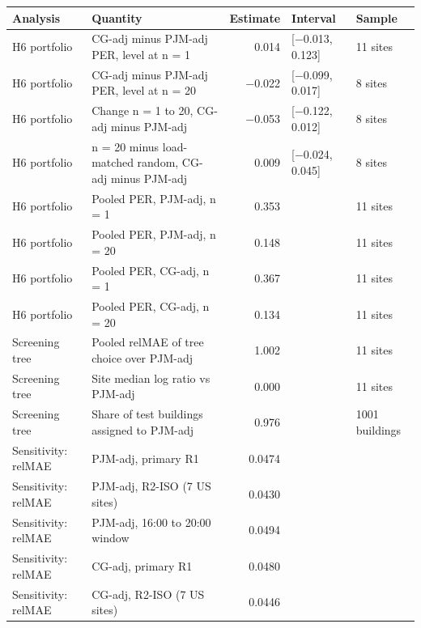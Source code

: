 \begin{tabular}{@{}l>{\raggedright\arraybackslash}p{6.4cm}rll@{}}
\toprule
Analysis & Quantity & Estimate & Interval & Sample \\
\midrule
H6 portfolio & CG-adj minus PJM-adj PER, level at n = 1 & 0.014 & [$-$0.013, 0.123] & 11 sites \\ %
H6 portfolio & CG-adj minus PJM-adj PER, level at n = 20 & $-$0.022 & [$-$0.099, 0.017] & 8 sites \\ %
H6 portfolio & Change n = 1 to 20, CG-adj minus PJM-adj & $-$0.053 & [$-$0.122, 0.012] & 8 sites \\ %
H6 portfolio & n = 20 minus load-matched random, CG-adj minus PJM-adj & 0.009 & [$-$0.024, 0.045] & 8 sites \\ %
H6 portfolio & Pooled PER, PJM-adj, n = 1 & 0.353 &  & 11 sites \\ %
H6 portfolio & Pooled PER, PJM-adj, n = 20 & 0.148 &  & 11 sites \\ %
H6 portfolio & Pooled PER, CG-adj, n = 1 & 0.367 &  & 11 sites \\ %
H6 portfolio & Pooled PER, CG-adj, n = 20 & 0.134 &  & 11 sites \\ %
\midrule
Screening tree & Pooled relMAE of tree choice over PJM-adj & 1.002 &  & 11 sites \\ %
Screening tree & Site median log ratio vs PJM-adj & 0.000 &  & 11 sites \\ %
Screening tree & Share of test buildings assigned to PJM-adj & 0.976 &  & 1001 buildings \\ %
\midrule
Sensitivity: relMAE & PJM-adj, primary R1 & 0.0474 &  &  \\ %
Sensitivity: relMAE & PJM-adj, R2-ISO (7 US sites) & 0.0430 &  &  \\ %
Sensitivity: relMAE & PJM-adj, 16:00 to 20:00 window & 0.0494 &  &  \\ %
Sensitivity: relMAE & CG-adj, primary R1 & 0.0480 &  &  \\ %
Sensitivity: relMAE & CG-adj, R2-ISO (7 US sites) & 0.0446 &  &  \\ %

\end{tabular}
